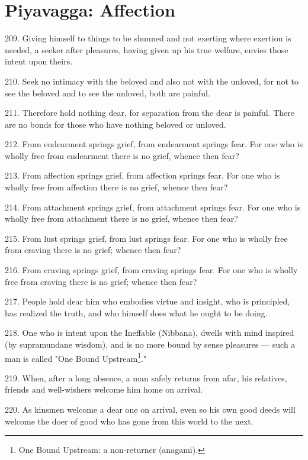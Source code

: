 \newpage
\chapter{Piyavagga: Affection}
209. Giving himself to things to be shunned and not exerting where exertion is needed, a seeker after pleasures, having given up his true welfare, envies those intent upon theirs.

210. Seek no intimacy with the beloved and also not with the unloved, for not to see the beloved and to see the unloved, both are painful.

211. Therefore hold nothing dear, for separation from the dear is painful. There are no bonds for those who have nothing beloved or unloved.

212. From endearment springs grief, from endearment springs fear. For one who is wholly free from endearment there is no grief, whence then fear?

213. From affection springs grief, from affection springs fear. For one who is wholly free from affection there is no grief, whence then fear?

214. From attachment springs grief, from attachment springs fear. For one who is wholly free from attachment there is no grief, whence then fear?

215. From lust springs grief, from lust springs fear. For one who is wholly free from craving there is no grief; whence then fear?

216. From craving springs grief, from craving springs fear. For one who is wholly free from craving there is no grief; whence then fear?

217. People hold dear him who embodies virtue and insight, who is principled, has realized the truth, and who himself does what he ought to be doing.

218. One who is intent upon the Ineffable (Nibbana), dwells with mind inspired (by supramundane wisdom), and is no more bound by sense pleasures — such a man is called "One Bound Upstream\footnote{One Bound Upstream: a non-returner (anagami).}."

219. When, after a long absence, a man safely returns from afar, his relatives, friends and well-wishers welcome him home on arrival.

220. As kinsmen welcome a dear one on arrival, even so his own good deeds will welcome the doer of good who has gone from this world to the next.
